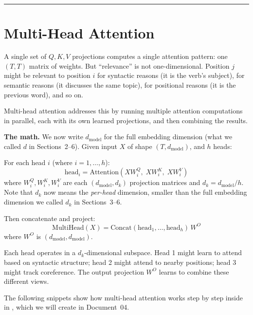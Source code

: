 
\bigskip\hrule\bigskip

\section{Multi-Head Attention}

A single set of $Q, K, V$ projections computes a single attention pattern: one $(T, T)$ matrix of weights. But ``relevance'' is not one-dimensional. Position $j$ might be relevant to position $i$ for syntactic reasons (it is the verb's subject), for semantic reasons (it discusses the same topic), for positional reasons (it is the previous word), and so on.

Multi-head attention addresses this by running multiple attention computations in parallel, each with its own learned projections, and then combining the results.

\textbf{The math.} We now write $d_{\text{model}}$ for the full embedding dimension (what we called $d$ in Sections~2--6). Given input $X$ of shape $(T, d_{\text{model}})$, and $h$ heads:

For each head $i$ (where $i = 1, \ldots, h$):
\[
\text{head}_i = \mathrm{Attention}(X W_i^Q,\; X W_i^K,\; X W_i^V)
\]
where $W_i^Q, W_i^K, W_i^V$ are each $(d_{\text{model}}, d_k)$ projection matrices and $d_k = d_{\text{model}} / h$. Note that $d_k$ now means the \emph{per-head} dimension, smaller than the full embedding dimension we called $d_k$ in Sections~3--6.

Then concatenate and project:
\[
\mathrm{MultiHead}(X) = \mathrm{Concat}(\text{head}_1, \ldots, \text{head}_h)\, W^O
\]
where $W^O$ is $(d_{\text{model}}, d_{\text{model}})$.

Each head operates in a $d_k$-dimensional subspace. Head 1 might learn to attend based on syntactic structure; head 2 might attend to nearby positions; head 3 might track coreference. The output projection $W^O$ learns to combine these different views.

The following snippets show how multi-head attention works step by step inside  in , which we will create in Document~04.

